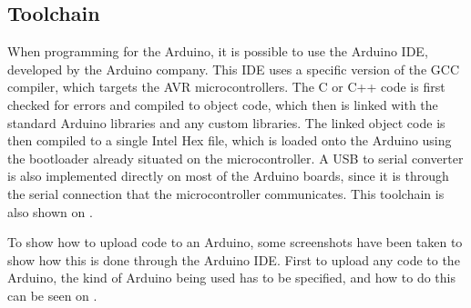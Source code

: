 \subsection{Toolchain}
When programming for the Arduino, it is possible to use the Arduino IDE, developed by the Arduino company.
This IDE uses a specific version of the GCC compiler, which targets the AVR microcontrollers.
The C or C++ code is first checked for errors and compiled to object code, which then is linked with the standard Arduino libraries and any custom libraries.
The linked object code is then compiled to a single Intel Hex file, which is loaded onto the Arduino using the bootloader already situated on the microcontroller.
A USB to serial converter is also implemented directly on most of the Arduino boards, since it is through the serial connection that the microcontroller communicates. 
This toolchain is also shown on .\cite{2015ArduinoToolchain}


\noindent
To show how to upload code to an Arduino, some screenshots have been taken to show how this is done through the Arduino IDE.
First to upload any code to the Arduino, the kind of Arduino being used has to be specified, and how to do this can be seen on .

